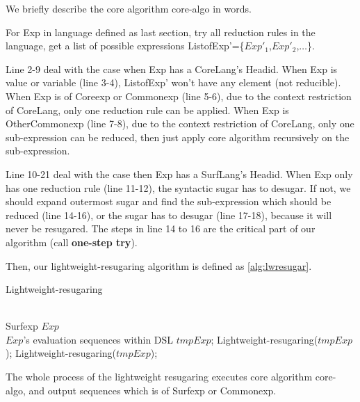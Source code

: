 We briefly describe the core algorithm core-algo in words.

For Exp in language defined as last section, try all reduction rules in the language, get a list of possible expressions ListofExp'=\{$Exp'_{1}$,$Exp'_{2}$,$\ldots$\}.

Line 2-9 deal with the case when Exp has a CoreLang's Headid. When Exp is value or variable (line 3-4), ListofExp' won't have any element (not reducible). When Exp is of Coreexp or Commonexp (line 5-6), due to the context restriction of CoreLang, only one reduction rule can be applied. When Exp is OtherCommonexp (line 7-8), due to the context restriction of CoreLang, only one sub-expression can be reduced, then just apply core algorithm recursively on the sub-expression.

Line 10-21 deal with the case then Exp has a SurfLang's Headid. When Exp only has one reduction rule (line 11-12), the syntactic sugar has to desugar. If not, we should expand outermost sugar and find the sub-expression which should be reduced (line 14-16), or the sugar has to desugar (line 17-18), because it will never be resugared. The steps in line 14 to 16 are the critical part of our algorithm (call {\bfseries one-step try}\label{mark:onesteptry}).


Then, our lightweight-resugaring algorithm is defined as \ref{alg:lwresugar}.

\begin{algorithm}
	\caption{Lightweight-resugaring}
	\label{alg:lwresugar}     %
	\begin{algorithmic}[1]       %
		\REQUIRE ~~\\      %
		Surfexp $Exp$
		\ENSURE ~~\\     %
		$Exp$'s evaluation sequences within DSL
		\RETURN
		\PRINT $tmpExp$;
		\STATE Lightweight-resugaring($tmpExp$);
		\ELSE
		\STATE Lightweight-resugaring($tmpExp$);
		\ENDIF
		\ENDWHILE

	\end{algorithmic}
\end{algorithm}

The whole process of the lightweight resugaring executes core algorithm core-algo, and output sequences which is of Surfexp or Commonexp.


